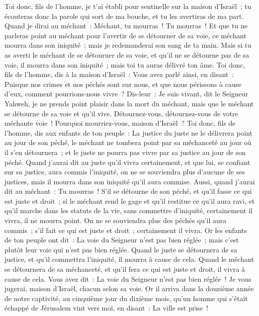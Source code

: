 \begin{multicols}{2}
Toi donc, fils de l'homme, je t'ai établi pour sentinelle sur la maison d'Israël~; tu écouteras donc la parole qui sort de ma bouche, et tu les avertiras de ma part.
Quand je dirai au méchant~: Méchant, tu mourras~! Tu mourras~! Et que tu ne parleras point au méchant pour l'avertir de se détourner de sa voie, ce méchant mourra dans son iniquité~; mais je redemanderai son sang de ta main.
Mais si tu as averti le méchant de se détourner de sa voie, et qu'il ne se détourne pas de sa voie, il mourra dans son iniquité~; mais toi tu auras délivré ton âme.
Toi donc, fils de l'homme, dis à la maison d'Israël~: Vous avez parlé ainsi, en disant~: Puisque nos crimes et nos péchés sont sur nous, et que nous périssons à cause d'eux, comment pourrions-nous vivre~?
Dis-leur~: Je suis vivant, dit le Seigneur Yahweh, je ne prends point plaisir dans la mort du méchant, mais que le méchant se détourne de sa voie et qu'il vive. Détournez-vous, détournez-vous de votre méchante voie~! Pourquoi mourriez-vous, maison d'Israël~?
Toi donc, fils de l'homme, dis aux enfants de ton peuple~: La justice du juste ne le délivrera point au jour de son péché, le méchant ne tombera point par sa méchanceté au jour où il s'en détournera~; et le juste ne pourra pas vivre par sa justice au jour de son péché.
Quand j'aurai dit au juste qu'il vivra certainement, et que lui, se confiant sur sa justice, aura commis l'iniquité, on ne se souviendra plus d'aucune de ses justices, mais il mourra dans son iniquité qu'il aura commise.
Aussi, quand j'aurai dit au méchant~: Tu mourras~! S'il se détourne de son péché, et qu'il fasse ce qui est juste et droit~;
si le méchant rend le gage et qu'il restitue ce qu'il aura ravi, et qu'il marche dans les statuts de la vie, sans commettre d'iniquité, certainement il vivra, il ne mourra point.
On ne se souviendra plus des péchés qu'il aura commis~; s'il fait ce qui est juste et droit~; certainement il vivra.
Or les enfants de ton peuple ont dit~: La voie du Seigneur n'est pas bien réglée~; mais c'est plutôt leur voie qui n'est pas bien réglée.
Quand le juste se détournera de sa justice, et qu'il commettra l'iniquité, il mourra à cause de cela.
Quand le méchant se détournera de sa méchanceté, et qu'il fera ce qui est juste et droit, il vivra à cause de cela.
Vous avez dit~: La voie du Seigneur n'est pas bien réglée~! Je vous jugerai, maison d'Israël, chacun selon sa voie.
Or il arriva dans la douzième année de notre captivité, au cinquième jour du dixième mois, qu'un homme qui s'était échappé de Jérusalem vint vers moi, en disant~: La ville est prise~!

\end{multicols}
